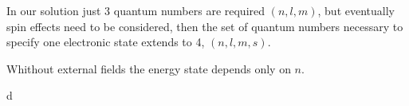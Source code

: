 \begin{questions}
\begin{solution}
  In our solution just 3 quantum numbers are required $(n,l,m)$, but eventually spin effects need to be considered, then the set of quantum numbers necessary to specify one electronic state extends to 4, $(n,l,m,s)$.

  Whithout external fields the energy state depends only on $n$.
\end{solution}

\begin{solution}
  d
\end{solution}
\end{questions}
